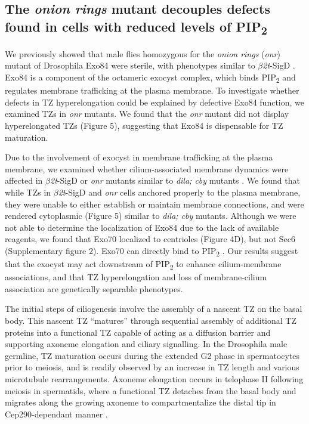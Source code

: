\documentclass[12pt, twoside, letterpaper]{article}
\newcommand{\PIP}{PIP\textsubscript{2}}
\newcommand{\sigd}{$\beta$\textit{2t}-SigD}
\begin{document}
\begin{doublespacing}
\begin{linenumbers}
    \subsection{The \textit{onion rings} mutant decouples defects found in cells with reduced levels of \PIP{}}
    We previously showed that male flies homozygous for the \textit{onion rings}
    (\textit{onr}) mutant of Drosophila Exo84 were sterile, with phenotypes
    similar to \sigd{} \citep{wei2008depletion}.
    Exo84 is a component of the octameric exocyst complex, which binds
    \PIP{} and regulates membrane trafficking at the plasma membrane.
    To investigate whether defects in TZ hyperelongation could be explained by
    defective Exo84 function, we examined TZs in \textit{onr} mutants.
    We found that the \textit{onr} mutant did not display hyperelongated TZs (Figure 5),
    suggesting that Exo84 is dispensable for TZ maturation.

    Due to the involvement of exocyst in membrane trafficking at the plasma membrane,
    we examined whether cilium-associated membrane dynamics were affected in \sigd{}
    or \textit{onr} mutants similar to \textit{dila; cby} mutants
    \citep{vieillard2016transition}.
    We found that while TZs in \sigd{} and \textit{onr} cells anchored properly
    to the plasma membrane, they were unable to either establish or maintain
    membrane connections, and were rendered cytoplasmic (Figure 5) similar to
    \textit{dila; cby} mutants.
    Although we were not able to determine the localization of Exo84 due to the
    lack of available reagents,
    we found that Exo70 localized to centrioles (Figure 4D),
    but not Sec6 (Supplementary figure 2).
    Exo70 can directly bind to \PIP{} \citep{he2007exo70}.
    Our results suggest that the exocyst may act downstream of \PIP{} to
    enhance cilium-membrane associations, and that TZ hyperelongation and loss of
    membrane-cilium association are genetically separable phenotypes.


    The initial steps of ciliogenesis involve the assembly of a nascent
    TZ on the basal body.
    This nascent TZ ``matures'' through sequential assembly of additional
    TZ proteins into a functional TZ capable of acting as a diffusion barrier
    and supporting axoneme elongation and ciliary signalling.
    In the Drosophila male germline, TZ maturation occurs during the
    extended G2 phase in spermatocytes prior to meiosis,
    and is readily observed by an increase in TZ length
    and various microtubule rearrangements.
    Axoneme elongation occurs in telophase II following meiosis in
    spermatids, where a functional TZ detaches from the basal body
    and migrates along the growing axoneme to compartmentalize the distal tip
    in Cep290-dependant manner \citep{basiri2014migrating}.


\end{linenumbers}
\end{doublespacing}
\end{document}
